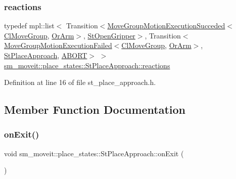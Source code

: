 \subsubsection{\texorpdfstring{reactions}{reactions}}
{\footnotesize\ttfamily typedef mpl\+::list$<$ Transition$<$\hyperlink{structmove__group__interface__client_1_1MoveGroupMotionExecutionSucceded}{Move\+Group\+Motion\+Execution\+Succeded}$<$\hyperlink{classmove__group__interface__client_1_1ClMoveGroup}{Cl\+Move\+Group}, \hyperlink{classsm__moveit_1_1OrArm}{Or\+Arm}$>$, \hyperlink{structsm__moveit_1_1place__states_1_1StOpenGripper}{St\+Open\+Gripper}$>$, Transition$<$\hyperlink{structmove__group__interface__client_1_1MoveGroupMotionExecutionFailed}{Move\+Group\+Motion\+Execution\+Failed}$<$\hyperlink{classmove__group__interface__client_1_1ClMoveGroup}{Cl\+Move\+Group}, \hyperlink{classsm__moveit_1_1OrArm}{Or\+Arm}$>$, \hyperlink{structsm__moveit_1_1place__states_1_1StPlaceApproach}{St\+Place\+Approach}, \hyperlink{classABORT}{A\+B\+O\+RT}$>$ $>$ \hyperlink{structsm__moveit_1_1place__states_1_1StPlaceApproach_a8532a592c622e84d25b282e727c1f475}{sm\+\_\+moveit\+::place\+\_\+states\+::\+St\+Place\+Approach\+::reactions}}



Definition at line 16 of file st\+\_\+place\+\_\+approach.\+h.



\subsection{Member Function Documentation}
\mbox{\label{structsm__moveit_1_1place__states_1_1StPlaceApproach_a4088322d84e4da8ce35253d2854a3710}} 
\subsubsection{\texorpdfstring{on\+Exit()}{onExit()}}
{\footnotesize\ttfamily void sm\+\_\+moveit\+::place\+\_\+states\+::\+St\+Place\+Approach\+::on\+Exit (\begin{DoxyParamCaption}{ }\end{DoxyParamCaption})\hspace{0.3cm}{\ttfamily [inline]}}



